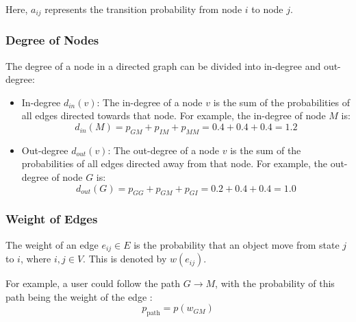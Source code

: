 \documentclass[12pt,a4paper]{article}
\begin{document}
Here, \(a_{ij}\) represents the transition probability from node \(i\) to node \(j\).

\subsubsection*{Degree of Nodes}
The degree of a node in a directed graph can be divided into in-degree and out-degree:
\begin{itemize}
    \item In-degree \(d_{in}(v)\): The in-degree of a node \(v\) is the sum of the probabilities of all edges directed towards that node. For example, the in-degree of node \(M\) is:
    \[
    d_{in}(M) = p_{GM} + p_{IM} + p_{MM} = 0.4 + 0.4 + 0.4 = 1.2
    \]
    \item Out-degree \(d_{out}(v)\): The out-degree of a node \(v\) is the sum of the probabilities of all edges directed away from that node. For example, the out-degree of node \(G\) is:
    \[
    d_{out}(G) = p_{GG} + p_{GM} + p_{GI} = 0.2 + 0.4 + 0.4 = 1.0
    \]
\end{itemize}

\subsubsection*{Weight of Edges}
The weight of an edge $e_{ij} \in E$ is the probability that an object move from state $j$ to $i$, where $i,j\in V$. This is denoted by $w(e_{ij})$.

For example, a user could follow the path \(G \to M\), with the probability of this path being the weight of the edge :
\[
p_{\text{path}} = p(w_{GM})
\]
\
\end{document}
